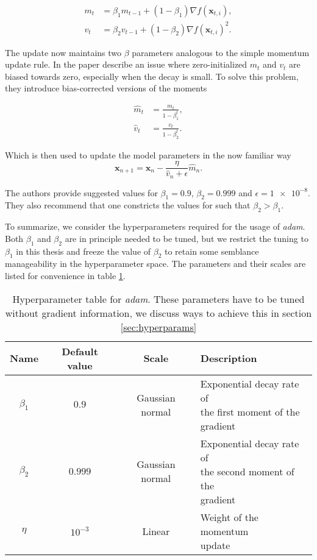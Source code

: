 \begin{align}
m_t &= \beta_1 m_{t-1} +(1-\beta_1)\nabla f(\boldsymbol{x}_{t, i}), \\
v_t &= \beta_2 v_{t-1} +(1-\beta_2)\nabla f(\boldsymbol{x}_{t, i})^2.
\end{align}

\noindent The update now maintains two $\beta$ parameters analogous to the simple momentum update rule. In the paper \citet{Kingma2015} describe an issue where zero-initialized $m_t$ and $v_t$ are biased towards zero, especially when the decay is small. To solve this problem, they introduce bias-corrected versions of the moments 

\begin{align}
\hat{m}_t &= \frac{m_t}{1 - \beta_1^t}, \\
\hat{v}_t &= \frac{v_t}{1 - \beta_2^t}.
\end{align}

\noindent Which is then used to update the model parameters in the now familiar way
\begin{equation}\label{eq:adam}
\boldsymbol{x}_{n+1} = \boldsymbol{x}_{n} - \frac{\eta}{\hat{v}_n + \epsilon}\hat{m}_n.
\end{equation}

\noindent The authors provide suggested values for $\beta_1 =0.9 $, $\beta_2 =0.999$ and $\epsilon = \num{1e-8}$. They also recommend that one constricts the values for such that $\beta_2 > \beta_1$. 

To summarize, we consider the hyperparameters required for the usage of \textit{adam}. Both $\beta_1$ and $\beta_2$ are in principle needed to be tuned, but we restrict the tuning to $\beta_1$ in this thesis and freeze the value of $\beta_2$ to retain some semblance manageability in the hyperparameter space. The parameters and their scales are listed for convenience in table \ref{tab:adam}.

\begin{table}
\begin{tabular}{cccl}
\toprule
Name &Default value & Scale  & Description\\
\midrule
$\beta_1$  & $0.9$ & Gaussian normal & \makecell[l]{Exponential decay rate of \\ the first moment of the \\ gradient}\\
$\beta_2$  & $0.999$ & Gaussian normal & \makecell[l]{Exponential decay rate of \\ the second moment of the \\ gradient}\\
$\eta$  & $10^{-3}$ & Linear & \makecell[l]{Weight of the momentum \\update} \\
\bottomrule
\end{tabular}
\caption{Hyperparameter table for \textit{adam}. These parameters have to be tuned without gradient information, we discuss ways to achieve this in section \ref{sec:hyperparams}}\label{tab:adam}
\end{table}

